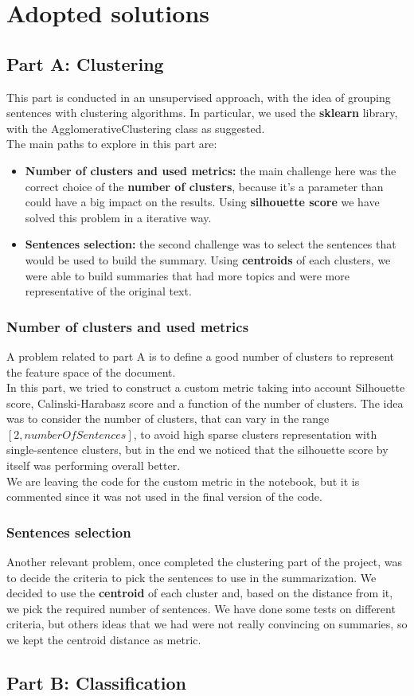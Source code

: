 \section{Adopted solutions}

\subsection*{Part A: Clustering}
This part is conducted in an unsupervised approach, with the idea of grouping
sentences with clustering algorithms. In particular, we used the
\textbf{sklearn} library, with the AgglomerativeClustering class as
suggested.\\ The main paths to explore in this part are:
\begin{itemize}
    \item \textbf{Number of clusters and used metrics: }  the main challenge here was the correct choice of the \textbf{number of clusters}, because it's a parameter than could have a big impact on the results. Using \textbf{silhouette score } we have solved this problem in a iterative way.
    \item \textbf{Sentences selection: } the second challenge was to select the sentences that would be used to build the summary. Using \textbf{centroids} of each clusters, we were able to build summaries that had more topics and were more representative of the original text.
\end{itemize}

\subsubsection*{Number of clusters and used metrics} 
A problem related to part A is to define a good number of clusters to represent the feature space of the document.\\
In this part, we tried to construct a custom metric taking into account Silhouette score, Calinski-Harabasz score and a function of the number of clusters. The idea was to consider the number of clusters, that can vary in the range $[2,numberOfSentences]$, to avoid high sparse clusters representation with single-sentence clusters, but in the end we noticed that the silhouette score by itself was performing overall better.\\We are leaving the code for the custom metric in the notebook, but it is commented since it was not used in the final version of the code.\\

\subsubsection*{Sentences selection}
Another relevant problem, once completed the clustering part of the project, was to decide the criteria to pick the sentences to use in the summarization. We decided to use the \textbf{centroid} of each cluster and, based on the distance from it, we pick the required number of sentences. We have done some tests on different criteria, but others ideas that we had were not really convincing on summaries, so we kept the centroid distance as metric. 
\subsection*{Part B: Classification}